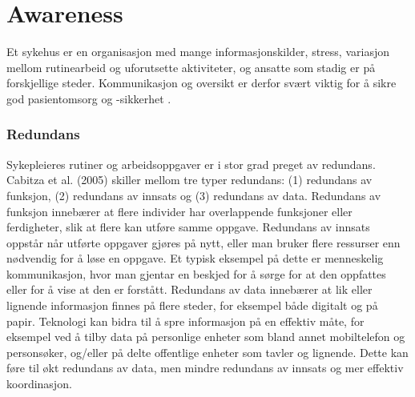 \section{Awareness}
\label{chp: awareness}

Et sykehus er en organisasjon med mange informasjonskilder, stress, variasjon mellom rutinearbeid og uforutsette aktiviteter, og ansatte som stadig er på forskjellige steder. Kommunikasjon og oversikt er derfor svært viktig for å sikre god pasientomsorg og -sikkerhet \cite{Klemets12}.

\subsubsection{Redundans}
Sykepleieres rutiner og arbeidsoppgaver er i stor grad preget av redundans. Cabitza et al. (2005) \nocite{Cabitza} skiller mellom tre typer redundans: (1) redundans av funksjon, (2) redundans av innsats og (3) redundans av data. Redundans av funksjon innebærer at flere individer har overlappende funksjoner eller ferdigheter, slik at flere kan utføre samme oppgave. Redundans av innsats oppstår når utførte oppgaver gjøres på nytt, eller man bruker flere ressurser enn nødvendig for å løse en oppgave. Et typisk eksempel på dette er menneskelig kommunikasjon, hvor man gjentar en beskjed for å sørge for at den oppfattes eller for å vise at den er forstått. Redundans av data innebærer at lik eller lignende informasjon finnes på flere steder, for eksempel både digitalt og på papir. Teknologi kan bidra til å spre informasjon på en effektiv måte, for eksempel ved å tilby data på personlige enheter som bland annet mobiltelefon og personsøker, og/eller på delte offentlige enheter som tavler og lignende. Dette kan føre til økt redundans av data, men mindre redundans av innsats og mer effektiv koordinasjon.

